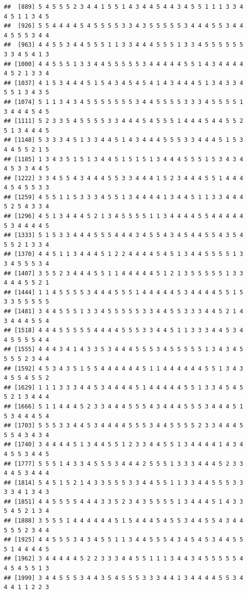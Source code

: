 \documentclass[
]{book}
\begin{document}
\begin{verbatim}
##  [889] 5 4 5 5 5 2 3 4 4 1 5 5 1 4 3 4 4 5 4 4 3 4 5 5 1 1 1 3 3 4 4 5 1 1 3 4 5
##  [926] 5 5 4 4 4 4 5 4 5 5 5 5 3 3 4 3 5 5 5 5 5 3 4 4 4 5 5 3 4 4 4 5 5 5 3 4 4
##  [963] 4 4 5 5 3 4 4 5 5 5 1 1 3 3 4 4 4 5 5 5 1 3 3 4 5 5 5 5 5 5 3 3 4 5 4 1 3
## [1000] 4 4 5 5 5 1 3 3 4 4 5 5 5 5 5 3 4 4 4 4 4 5 5 1 4 3 4 4 4 4 4 5 2 1 3 3 4
## [1037] 4 1 5 3 4 4 4 5 1 5 4 3 4 5 4 5 4 1 4 3 4 4 4 5 1 3 4 3 3 4 5 5 1 3 4 3 5
## [1074] 5 1 1 3 4 3 4 5 5 5 5 5 5 5 3 4 4 5 5 5 5 3 3 3 4 5 5 5 5 1 3 4 4 4 5 4 5
## [1111] 5 2 3 3 5 4 5 5 5 5 3 3 4 4 4 5 4 5 5 5 1 4 4 4 5 4 4 5 5 2 5 1 3 4 4 4 5
## [1148] 5 3 3 3 4 5 1 3 3 4 4 5 1 4 3 4 4 4 5 5 5 3 3 4 4 4 5 1 5 3 4 4 5 5 2 1 5
## [1185] 1 3 4 3 5 1 5 1 3 4 4 5 1 5 1 5 1 3 4 4 4 5 5 5 1 5 3 4 3 4 4 5 3 3 4 4 5
## [1222] 3 3 4 5 5 4 3 4 4 4 5 5 3 3 4 4 4 1 5 2 3 4 4 4 5 5 1 4 4 4 4 5 4 5 5 3 3
## [1259] 4 5 5 1 1 5 3 3 3 4 5 5 1 3 4 4 4 4 1 3 4 4 5 1 1 3 3 4 4 4 5 2 5 4 3 3 4
## [1296] 4 5 1 3 4 4 4 5 2 1 3 4 5 5 5 5 1 1 3 4 4 4 4 5 5 4 4 4 4 4 5 3 4 4 4 4 5
## [1333] 5 1 5 3 3 4 4 4 5 5 5 4 4 4 3 4 5 5 4 3 4 5 4 4 5 5 4 3 5 4 5 5 2 1 3 3 4
## [1370] 4 4 5 1 1 3 4 4 4 5 1 2 2 4 4 4 4 5 4 5 1 3 4 4 5 5 5 5 1 3 3 4 5 5 5 3 4
## [1407] 3 5 5 2 3 4 4 4 5 5 1 1 4 4 4 4 4 5 1 2 1 3 5 5 5 5 5 1 3 3 4 4 4 5 5 2 1
## [1444] 1 1 4 5 5 5 5 3 4 4 4 5 5 5 1 4 4 4 4 4 5 3 4 4 4 4 5 5 1 5 3 3 5 5 5 5 5
## [1481] 3 4 4 5 5 5 1 3 3 4 5 5 5 5 5 3 3 4 4 5 5 3 3 3 4 4 5 2 1 4 3 4 4 4 5 5 4
## [1518] 4 4 4 5 5 5 5 5 4 4 4 4 5 5 5 3 3 4 4 5 1 1 3 3 3 4 4 5 3 4 4 5 5 5 5 4 4
## [1555] 4 4 4 3 4 1 4 3 3 5 3 4 4 4 5 5 5 3 4 5 5 5 5 5 1 3 4 3 4 5 5 5 5 2 3 4 4
## [1592] 4 5 3 4 3 5 1 5 5 4 4 4 4 4 4 5 1 1 4 4 4 4 4 4 5 5 1 3 4 3 4 5 5 4 5 5 2
## [1629] 1 1 1 3 3 3 4 4 5 3 4 4 4 4 5 1 4 4 4 4 4 5 5 1 3 3 4 5 4 5 5 2 1 3 4 4 4
## [1666] 5 1 1 4 4 4 5 2 3 3 4 4 4 5 5 5 4 3 4 4 4 5 5 5 3 4 4 4 5 1 5 3 4 4 4 5 4
## [1703] 5 5 5 3 3 4 4 5 3 4 4 4 4 5 5 5 3 4 4 5 5 5 5 2 3 3 4 4 4 5 5 5 4 3 4 3 4
## [1740] 3 4 4 4 4 5 1 3 4 4 5 5 1 2 3 3 4 4 5 5 1 3 4 4 4 4 1 4 3 4 4 5 5 3 4 4 5
## [1777] 5 5 5 1 4 3 3 4 5 5 5 3 4 4 4 2 5 5 5 1 3 3 3 4 4 4 5 2 3 3 4 4 5 3 4 4 4
## [1814] 5 4 5 1 5 2 1 4 3 3 5 5 5 3 3 4 4 5 5 1 1 3 3 4 4 5 5 5 3 3 3 3 4 1 3 4 3
## [1851] 4 4 5 5 5 5 4 4 4 3 3 5 2 3 4 3 5 5 5 5 1 3 4 4 4 5 1 4 3 3 5 4 5 2 1 3 4
## [1888] 3 5 5 5 1 4 4 4 4 4 4 5 1 5 4 4 4 5 4 5 5 3 4 4 5 5 4 3 4 4 5 5 5 2 3 4 4
## [1925] 4 4 5 5 5 3 4 3 4 5 5 1 1 3 4 4 5 5 5 4 3 4 5 4 5 3 4 4 5 5 5 1 4 4 4 4 5
## [1962] 3 4 4 4 4 4 5 2 2 3 3 3 4 4 5 5 1 1 1 3 4 4 3 4 5 5 5 5 5 4 4 5 4 5 5 1 3
## [1999] 3 4 4 5 5 5 3 4 4 3 5 4 5 5 5 3 3 3 4 4 1 3 4 4 4 4 5 5 3 4 4 4 1 1 2 2 3

\end{verbatim}
\end{document}
